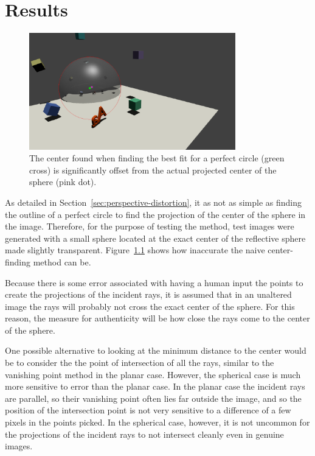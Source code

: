 \documentclass{thesis}
\begin{document}



\chapter{Results}
\begin{figure}
	\centering
    	\includegraphics[width=0.8\textwidth]{center-error}
	\caption{The center found when finding the best fit for a perfect circle (green cross) is significantly offset from the actual projected center of the sphere (pink dot).}
	\label{center-error}
\end{figure}

As detailed in Section~\ref{sec:perspective-distortion}, it as not as simple as finding the outline of a perfect circle to find the projection of the center of the sphere in the image. Therefore, for the purpose of testing the method, test images were generated with a small sphere located at the exact center of the reflective sphere made slightly transparent. Figure~\ref{center-error} shows how inaccurate the naive center-finding method can be.

Because there is some error associated with having a human input the points to create the projections of the incident rays, it is assumed that in an unaltered image the rays will probably not cross the exact center of the sphere. For this reason, the measure for authenticity will be how close the rays come to the center of the sphere.

One possible alternative to looking at the minimum distance to the center would be to consider the the point of intersection of all the rays, similar to the vanishing point method in the planar case. However, the spherical case is much more sensitive to error than the planar case. In the planar case the incident rays are parallel, so their vanishing point often lies far outside the image, and so the position of the intersection point is not very sensitive to a difference of a few pixels in the points picked. In the spherical case, however, it is not uncommon for the projections of the incident rays to not intersect cleanly even in genuine images.
\end{document}
